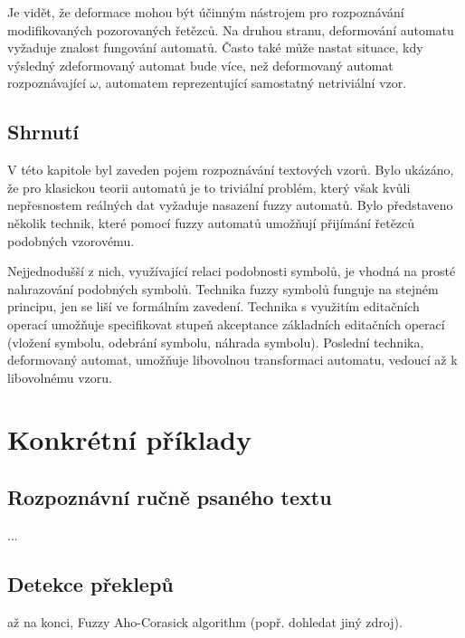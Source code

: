 \documentclass[a4paper,10pt]{article}
\begin{document}
Je vidět, že deformace mohou být účinným nástrojem pro rozpoznávání modifikovaných pozorovaných řetězců. Na druhou stranu, deformování automatu vyžaduje znalost fungování automatů. Často také může nastat situace, kdy výsledný zdeformovaný automat bude více, než deformovaný automat rozpoznávající $\omega$, automatem reprezentující samostatný netriviální vzor.

\subsection{Shrnutí}
V této kapitole byl zaveden pojem rozpoznávání textových vzorů. Bylo ukázáno, že pro klasickou teorii automatů je to triviální problém, který však kvůli nepřesnostem reálných dat vyžaduje nasazení fuzzy automatů. Bylo představeno několik technik, které pomocí fuzzy automatů umožňují přijímání řetězců podobných vzorovému. 

Nejjednodušší z nich, využívající relaci podobnosti symbolů, je vhodná na prosté nahrazování podobných symbolů. Technika fuzzy symbolů funguje na stejném principu, jen se liší ve formálním zavedení. Technika s využitím editačních operací umožňuje specifikovat stupeň akceptance základních editačních operací (vložení symbolu, odebrání symbolu, náhrada symbolu). Poslední technika, deformovaný automat, umožňuje libovolnou transformaci automatu, vedoucí až k libovolnému vzoru.




\section{Konkrétní příklady}
\subsection{Rozpoznávní ručně psaného textu}
...

\subsection{Detekce překlepů}
\cite{AndAbdAsm-ApprPattMatcFuzzLog} až na konci,  Fuzzy Aho-Corasick algorithm (popř. dohledat jiný zdroj).
\newpage


\end{document}
